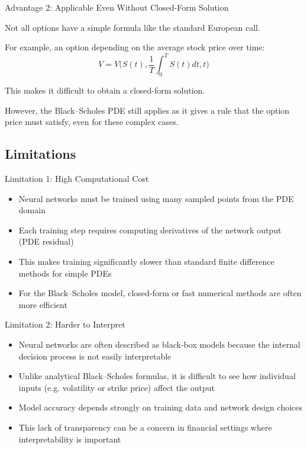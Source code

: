 \begin{frame}{Advantage 2: Applicable Even Without Closed-Form Solution}

Not all options have a simple formula like the standard European call.

\vspace{0.3cm}

For example, an option depending on the average stock price over time:
\[
V = V\Big(S(t), \frac{1}{T}\int_0^T S(t) dt, t\Big)
\]

This makes it difficult to obtain a closed-form solution.

\vspace{0.3cm}

However, the Black--Scholes PDE still applies as it gives a rule that the option price must satisfy, even for these complex cases.

\end{frame}

\subsection{Limitations}

\begin{frame}{Limitation 1: High Computational Cost}

\begin{itemize}
\item Neural networks must be trained using many sampled points from the PDE domain
\item Each training step requires computing derivatives of the network output (PDE residual)
\item This makes training significantly slower than standard finite difference methods for simple PDEs
\item For the Black--Scholes model, closed-form or fast numerical methods are often more efficient
\end{itemize}

\end{frame}

\begin{frame}{Limitation 2: Harder to Interpret}

\begin{itemize}
\item Neural networks are often described as black-box models because the internal decision process is not easily interpretable
\item Unlike analytical Black--Scholes formulas, it is difficult to see how individual inputs (e.g. volatility or strike price) affect the output
\item Model accuracy depends strongly on training data and network design choices
\item This lack of transparency can be a concern in financial settings where interpretability is important
\end{itemize}

\end{frame}

